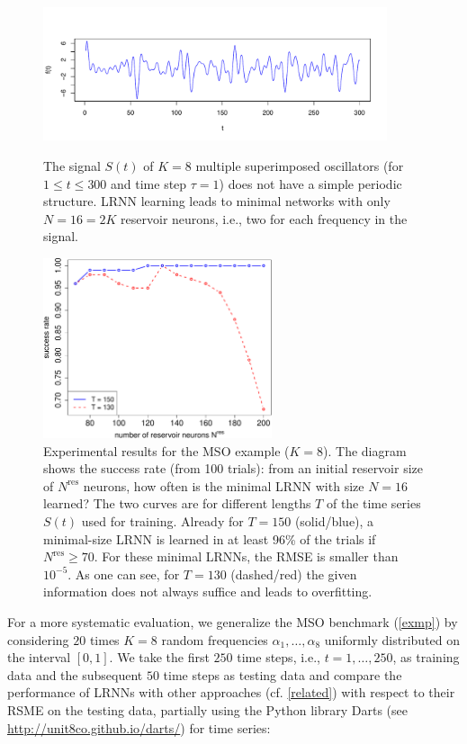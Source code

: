 \documentclass[twoside,11pt]{article}
\theoremstyle{definition}
\begin{document}
\begin{figure}
  \centering
  \includegraphics[width=0.9\textwidth]{fig/signal2}
  \caption{The signal $S(t)$ of $K=8$ multiple superimposed oscillators (for $1 \le t
	\le 300$ and time step $\tau=1$) does not have a simple periodic structure. LRNN learning leads
	to minimal networks with only $N=16=2K$ reservoir neurons, i.e., two for
	each frequency in the signal.}
  \label{signal}
\bigskip
  \includegraphics[width=0.6\textwidth]{fig/mso8}%
  \caption{Experimental results for the MSO example ($K=8$). The diagram shows the
	success rate (from 100 trials): from an initial reservoir size of $N^\mathrm{res}$
	neurons, how often is the minimal LRNN with size
	$N=16$ learned? The two curves are for different lengths $T$ of the time series
	$S(t)$ used for training. Already for $T=150$ (solid/blue), a
	minimal-size LRNN is learned in at least 96\% of the trials if
	$N^\mathrm{res} \ge 70$. For these minimal LRNNs, the RMSE is smaller
	than $10^{-5}$. As one can see, for $T=130$ (dashed/red) the given
	information does not always suffice and leads to overfitting.}
  \label{mso8}
\end{figure}

For a more systematic evaluation, we generalize the MSO benchmark (\cref{exmp})
by considering $20$ times $K=8$ random frequencies $\alpha_1,\dots,\alpha_8$
uniformly distributed on the interval $[0,1]$. We take the first $250$ time
steps, i.e., $t=1,\dots,250$, as training data and the subsequent $50$ time
steps as testing data and compare the performance of LRNNs with other approaches
(cf. \cref{related}) with respect to their RSME on the testing data, partially
using the Python library Darts (see \url{http://unit8co.github.io/darts/}) for
time series:
\end{document}
